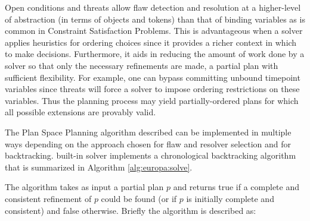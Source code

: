 Open conditions and threats allow flaw detection and resolution at a
higher-level of abstraction (\ie in terms of objects and tokens) than
that of binding variables as is common in Constraint Satisfaction
Problems. This is advantageous when a solver applies heuristics for
ordering choices since it provides a richer context in which to make
decisions.  Furthermore, it aids in reducing the amount of work done
by a solver so that only the necessary refinements are made,
 a partial plan with sufficient flexibility. For
example, one can bypass committing unbound timepoint variables since
threats will force a solver to impose ordering restrictions on these
variables.  Thus the planning process may yield partially-ordered
plans for which all possible extensions are provably valid.

The Plan Space Planning algorithm described can be implemented in
multiple ways depending on the approach chosen for flaw and resolver
selection and for backtracking. \eus built-in solver implements a
chronological backtracking algorithm that is summarized in Algorithm
\ref{alg:europa:solve}.


\begin{algorithm}
\caption{$\mathrm{bool} ~ solve(plan)$}
\label{alg:europa:solve}
\end{algorithm}

The algorithm takes as input a partial plan $p$ and returns true if a
complete and consistent refinement of $p$ could be found (or if $p$ is
initially complete and consistent) and false otherwise. Briefly the
algorithm is described as:

